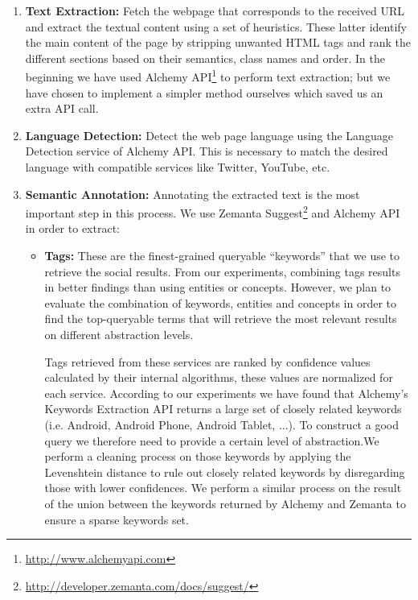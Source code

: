 \begin{enumerate}

\item {\bf Text Extraction:} Fetch the webpage that corresponds to the received URL and extract the textual content using a set of heuristics. These latter identify the main content of the page by stripping unwanted HTML tags and rank the different sections based on their semantics, class names and order. In the beginning we have used Alchemy API\footnote{\url{http://www.alchemyapi.com}} to perform text extraction; but we have chosen to implement a simpler method ourselves which saved us an extra API call.

\item {\bf Language Detection:} Detect the web page language using the Language Detection service of Alchemy API. This is necessary to match the desired language with compatible services like Twitter, YouTube, etc.

\item {\bf Semantic Annotation:} Annotating the extracted text is the most important step in this process. We use Zemanta Suggest\footnote{\url{http://developer.zemanta.com/docs/suggest/}} and Alchemy API in order to extract:

\begin{itemize}
\item {\bf Tags:} These are the finest-grained queryable ``keywords'' that we use to retrieve the social results. From our experiments, combining tags results in better findings than using entities or concepts. However, we plan to evaluate the combination of keywords, entities and concepts in order to find the top-queryable terms that will retrieve the most relevant results on different abstraction levels.

Tags retrieved from these services are ranked by confidence values calculated by their internal algorithms, these values are normalized for each service. According to our experiments we have found that Alchemy's Keywords Extraction API returns a large set of closely related keywords (i.e. Android, Android Phone, Android Tablet, ...). To construct a good query we therefore need to provide a certain level of abstraction.We perform a cleaning process on those keywords by applying the Levenshtein distance to rule out closely related keywords by disregarding those with lower confidences. We perform a similar process on the result of the union between the keywords returned by Alchemy and Zemanta to ensure a sparse keywords set.


\end{itemize}
\end{enumerate}
